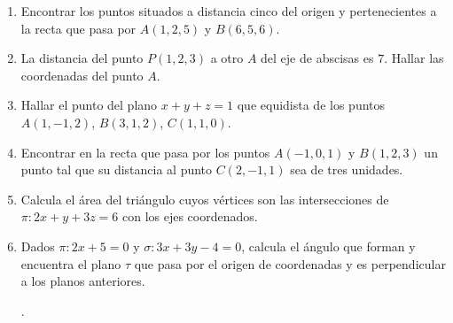 \begin{enumerate}
\vspace{2mm} 

\item  Encontrar los puntos situados a distancia cinco del origen y pertenecientes a la recta que pasa por $A(1,2,5)$ y $B(6,5,6)$.

\vspace{2mm} 
 
\item La distancia del punto $P(1,2,3)$ a otro $A$ del eje de abscisas es $7$. Hallar las coordenadas del punto $A$. 

\vspace{2mm} 

\item Hallar el punto del plano $x+y+z=1$ que equidista de los puntos $A(1,-1,2)$, $B(3,1,2)$, $C(1,1,0)$. 

\vspace{2mm} 

\item Encontrar en la recta que pasa por los puntos $A(-1,0,1)$ y $B(1,2,3)$ un punto tal que su distancia al punto $C(2,-1,1)$ sea de tres unidades. 

\vspace{2mm} 

\item Calcula el área del triángulo cuyos vértices son las intersecciones de $\pi: 2x+y+3z=6$ con los ejes coordenados.

\vspace{2mm} 

\item Dados $\pi:2x+5=0$ y $\sigma:3x+3y-4=0$, calcula el ángulo que forman y encuentra el plano $\tau$ que pasa por el origen de coordenadas y es perpendicular a los planos anteriores.

.


\end{enumerate}
